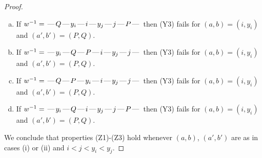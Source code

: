 \documentclass[10pt]{article}
\theoremstyle{definition}
\theoremstyle{definition}
\def\dash{\text{\hspace{0.5mm}---\hspace{0.5mm}}}
\begin{document}
\begin{proof}
\begin{enumerate}
\begin{enumerate}[(a)]
\item If $w^{-1} = \dash Q\dash y_i\dash i\dash y_j\dash j\dash P\dash $ then (Y3) fails for $(a,b)=(i,y_i)$ and $(a',b')=(P,Q)$.
\item If $w^{-1} = \dash y_i\dash Q\dash P\dash i\dash y_j\dash j\dash $ then (Y3) fails for $(a,b)=(i,y_i)$ and $(a',b')=(P,Q)$.
\item If $w^{-1} = \dash Q\dash P\dash y_i\dash i\dash y_j\dash j\dash $ then (Y3) fails for $(a,b)=(i,y_i)$ and $(a',b')=(P,Q)$.
\item If $w^{-1} = \dash y_i\dash Q\dash i\dash y_j\dash j\dash P\dash $ then (Y3) fails for $(a,b)=(i,y_i)$ and $(a',b')=(P,Q)$.
\end{enumerate}
\end{enumerate}
We conclude that properties (Z1)-(Z3) hold whenever $(a,b)$, $(a',b')$ are as in cases (i) or (ii) and $i < j < y_i < y_j$.

\end{proof}
\end{document}
